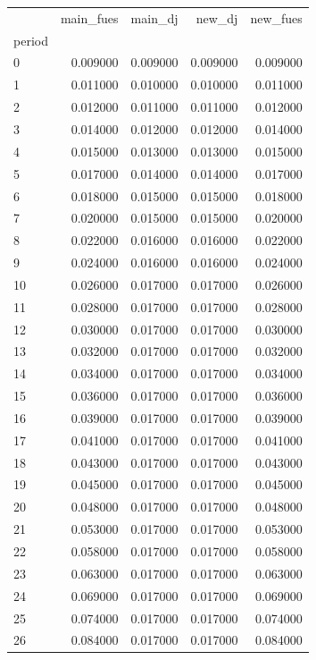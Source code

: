 \begin{tabular}{lrrrr}
\toprule
 & main_fues & main_dj & new_dj & new_fues \\
period &  &  &  &  \\
\midrule
0 & 0.009000 & 0.009000 & 0.009000 & 0.009000 \\
1 & 0.011000 & 0.010000 & 0.010000 & 0.011000 \\
2 & 0.012000 & 0.011000 & 0.011000 & 0.012000 \\
3 & 0.014000 & 0.012000 & 0.012000 & 0.014000 \\
4 & 0.015000 & 0.013000 & 0.013000 & 0.015000 \\
5 & 0.017000 & 0.014000 & 0.014000 & 0.017000 \\
6 & 0.018000 & 0.015000 & 0.015000 & 0.018000 \\
7 & 0.020000 & 0.015000 & 0.015000 & 0.020000 \\
8 & 0.022000 & 0.016000 & 0.016000 & 0.022000 \\
9 & 0.024000 & 0.016000 & 0.016000 & 0.024000 \\
10 & 0.026000 & 0.017000 & 0.017000 & 0.026000 \\
11 & 0.028000 & 0.017000 & 0.017000 & 0.028000 \\
12 & 0.030000 & 0.017000 & 0.017000 & 0.030000 \\
13 & 0.032000 & 0.017000 & 0.017000 & 0.032000 \\
14 & 0.034000 & 0.017000 & 0.017000 & 0.034000 \\
15 & 0.036000 & 0.017000 & 0.017000 & 0.036000 \\
16 & 0.039000 & 0.017000 & 0.017000 & 0.039000 \\
17 & 0.041000 & 0.017000 & 0.017000 & 0.041000 \\
18 & 0.043000 & 0.017000 & 0.017000 & 0.043000 \\
19 & 0.045000 & 0.017000 & 0.017000 & 0.045000 \\
20 & 0.048000 & 0.017000 & 0.017000 & 0.048000 \\
21 & 0.053000 & 0.017000 & 0.017000 & 0.053000 \\
22 & 0.058000 & 0.017000 & 0.017000 & 0.058000 \\
23 & 0.063000 & 0.017000 & 0.017000 & 0.063000 \\
24 & 0.069000 & 0.017000 & 0.017000 & 0.069000 \\
25 & 0.074000 & 0.017000 & 0.017000 & 0.074000 \\
26 & 0.084000 & 0.017000 & 0.017000 & 0.084000 \\

\end{tabular}
